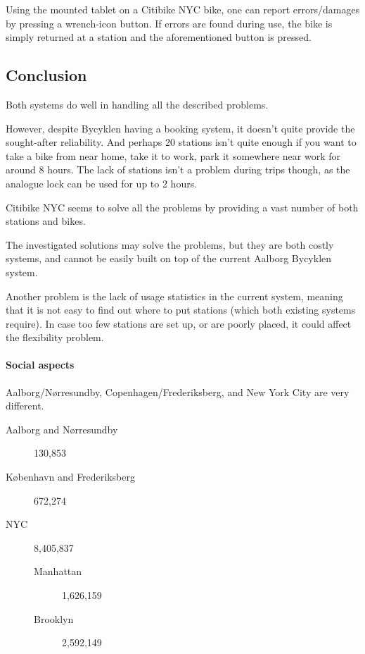 Using the mounted tablet on a Citibike NYC bike, one can report errors/damages by pressing a wrench-icon button.
If errors are found during use, the bike is simply returned at a station and the aforementioned button is pressed.

\subsection{Conclusion}
Both systems do well in handling all the described problems.

However, despite Bycyklen having a booking system, it doesn't quite provide the sought-after reliability.
And perhaps 20 stations isn't quite enough if you want to take a bike from near home, take it to work, park it somewhere near work for around 8 hours.
The lack of stations isn't a problem during trips though, as the analogue lock can be used for up to 2 hours.

Citibike NYC seems to solve all the problems by providing a vast number of both stations and bikes.

The investigated solutions may solve the problems, but they are both costly systems, and cannot be easily built on top of the current Aalborg Bycyklen system.

Another problem is the lack of usage statistics in the current system, meaning that it is not easy to find out where to put stations (which both existing systems require).
In case too few stations are set up, or are poorly placed, it could affect the flexibility problem.

\paragraph{Social aspects}
Aalborg/Nørresundby, Copenhagen/Frederiksberg, and New York City are very different.
\begin{description}
\item[Aalborg and Nørresundby\cite{bef44}] 130,853
\item[København and Frederiksberg\cite{bef44}] 672,274
\item[NYC\cite{nyc}] 8,405,837
\begin{description}
\item[Manhattan\cite{nyc}] 1,626,159
\item[Brooklyn\cite{nyc}] 2,592,149
\end{description}
\end{description}

